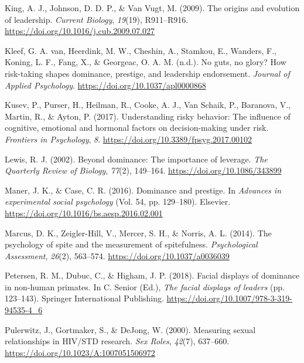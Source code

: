 \documentclass[
  english,
  a4paper,floatsintext]{apa7}
\newlength{\cslhangindent}
\newlength{\cslentryspacingunit} %
\newenvironment{CSLReferences}[2] %
 {%
  \setlength{\parindent}{0pt}
  \ifodd #1
  \let\oldpar\par
  \def\par{\hangindent=\cslhangindent\oldpar}
  \fi
  \setlength{\parskip}{#2\cslentryspacingunit}
 }%
 {}
\begin{document}
\begin{CSLReferences}{1}{0}
\leavevmode{}%
King, A. J., Johnson, D. D. P., \& Van Vugt, M. (2009). The origins and evolution of leadership. \emph{Current Biology}, \emph{19}(19), R911--R916. \url{https://doi.org/10.1016/j.cub.2009.07.027}

\leavevmode{}%
Kleef, G. A. van, Heerdink, M. W., Cheshin, A., Stamkou, E., Wanders, F., Koning, L. F., Fang, X., \& Georgeac, O. A. M. (n.d.). No guts, no glory? How risk-taking shapes dominance, prestige, and leadership endorsement. \emph{Journal of Applied Psychology}. \url{https://doi.org/10.1037/apl0000868}

\leavevmode{}%
Kusev, P., Purser, H., Heilman, R., Cooke, A. J., Van Schaik, P., Baranova, V., Martin, R., \& Ayton, P. (2017). Understanding risky behavior: The influence of cognitive, emotional and hormonal factors on decision-making under risk. \emph{Frontiers in Psychology}, \emph{8}. \url{https://doi.org/10.3389/fpsyg.2017.00102}

\leavevmode{}%
Lewis, R. J. (2002). Beyond dominance: The importance of leverage. \emph{The Quarterly Review of Biology}, \emph{77}(2), 149--164. \url{https://doi.org/10.1086/343899}

\leavevmode{}%
Maner, J. K., \& Case, C. R. (2016). Dominance and prestige. In \emph{Advances in experimental social psychology} (Vol. 54, pp. 129--180). Elsevier. \url{https://doi.org/10.1016/bs.aesp.2016.02.001}

\leavevmode{}%
Marcus, D. K., Zeigler-Hill, V., Mercer, S. H., \& Norris, A. L. (2014). The psychology of spite and the measurement of spitefulness. \emph{Psychological Assessment}, \emph{26}(2), 563--574. \url{https://doi.org/10.1037/a0036039}

\leavevmode{}%
Petersen, R. M., Dubuc, C., \& Higham, J. P. (2018). Facial displays of dominance in non-human primates. In C. Senior (Ed.), \emph{The facial displays of leaders} (pp. 123--143). Springer International Publishing. \url{https://doi.org/10.1007/978-3-319-94535-4_6}

\leavevmode{}%
Pulerwitz, J., Gortmaker, S., \& DeJong, W. (2000). Measuring sexual relationships in {HIV}/{STD} research. \emph{Sex Roles}, \emph{42}(7), 637--660. \url{https://doi.org/10.1023/A:1007051506972}


\end{CSLReferences}
\end{document}
